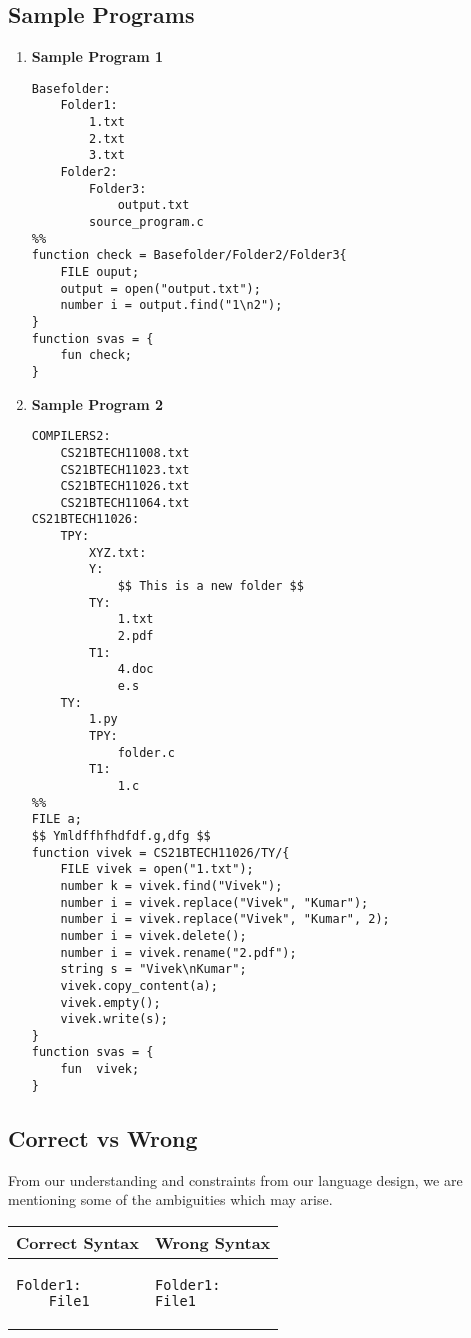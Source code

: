 \documentclass{article}
\begin{document}
\subsection{Sample Programs}
\begin{enumerate}
\item \textbf{Sample Program 1}
\begin{verbatim}
Basefolder:
    Folder1:
        1.txt
        2.txt
        3.txt
    Folder2:
        Folder3:
            output.txt
        source_program.c
%%
function check = Basefolder/Folder2/Folder3{
    FILE ouput;
    output = open("output.txt");
    number i = output.find("1\n2");
}
function svas = {
    fun check;
}
\end{verbatim}
\item \textbf{Sample Program 2}
\begin{verbatim}
COMPILERS2:
    CS21BTECH11008.txt
    CS21BTECH11023.txt
    CS21BTECH11026.txt
    CS21BTECH11064.txt
CS21BTECH11026:
    TPY:
        XYZ.txt:
        Y:
            $$ This is a new folder $$
        TY:
            1.txt
            2.pdf
        T1:
            4.doc
            e.s
    TY:
        1.py
        TPY:
            folder.c
        T1:
            1.c
%%
FILE a;
$$ Ymldffhfhdfdf.g,dfg $$
function vivek = CS21BTECH11026/TY/{
    FILE vivek = open("1.txt");
    number k = vivek.find("Vivek");
    number i = vivek.replace("Vivek", "Kumar");
    number i = vivek.replace("Vivek", "Kumar", 2);
    number i = vivek.delete();
    number i = vivek.rename("2.pdf");
    string s = "Vivek\nKumar";
    vivek.copy_content(a);
    vivek.empty();
    vivek.write(s);
}
function svas = {
    fun  vivek;
}
\end{verbatim}

\end{enumerate}

\subsection{Correct vs Wrong}
From our understanding and constraints from our language design, we are mentioning some of the ambiguities which may arise.
\begin{table}[h]
\centering
\begin{tabular}{|p{}|p{}|}
\hline
\textbf{Correct Syntax} & \textbf{Wrong Syntax} \\
\hline
\begin{verbatim}
Folder1:
    File1
\end{verbatim}
&
\begin{verbatim}
Folder1:
File1
\end{verbatim}
\\
\hline
\end{tabular}
\end{table}
\end{document}
